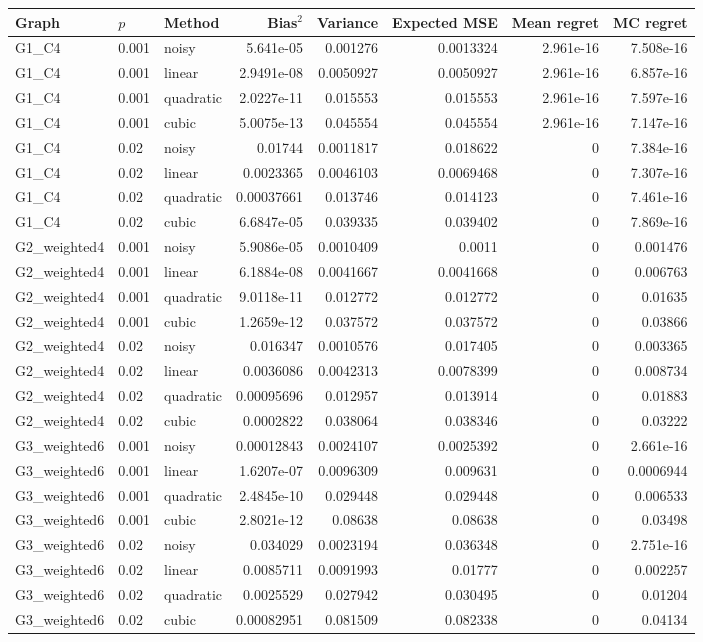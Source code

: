 \documentclass{article}
\begin{document}
\begin{center}\scriptsize
\begin{tabular}{lllrrrrr}\toprule
Graph & $p$ & Method & Bias$^2$ & Variance & Expected MSE & Mean regret & MC regret\\\midrule
G1\_C4 & 0.001 & noisy & 5.641e-05 & 0.001276 & 0.0013324 & 2.961e-16 & 7.508e-16 \\
G1\_C4 & 0.001 & linear & 2.9491e-08 & 0.0050927 & 0.0050927 & 2.961e-16 & 6.857e-16 \\
G1\_C4 & 0.001 & quadratic & 2.0227e-11 & 0.015553 & 0.015553 & 2.961e-16 & 7.597e-16 \\
G1\_C4 & 0.001 & cubic & 5.0075e-13 & 0.045554 & 0.045554 & 2.961e-16 & 7.147e-16 \\
G1\_C4 & 0.02 & noisy & 0.01744 & 0.0011817 & 0.018622 & 0 & 7.384e-16 \\
G1\_C4 & 0.02 & linear & 0.0023365 & 0.0046103 & 0.0069468 & 0 & 7.307e-16 \\
G1\_C4 & 0.02 & quadratic & 0.00037661 & 0.013746 & 0.014123 & 0 & 7.461e-16 \\
G1\_C4 & 0.02 & cubic & 6.6847e-05 & 0.039335 & 0.039402 & 0 & 7.869e-16 \\
G2\_weighted4 & 0.001 & noisy & 5.9086e-05 & 0.0010409 & 0.0011 & 0 & 0.001476 \\
G2\_weighted4 & 0.001 & linear & 6.1884e-08 & 0.0041667 & 0.0041668 & 0 & 0.006763 \\
G2\_weighted4 & 0.001 & quadratic & 9.0118e-11 & 0.012772 & 0.012772 & 0 & 0.01635 \\
G2\_weighted4 & 0.001 & cubic & 1.2659e-12 & 0.037572 & 0.037572 & 0 & 0.03866 \\
G2\_weighted4 & 0.02 & noisy & 0.016347 & 0.0010576 & 0.017405 & 0 & 0.003365 \\
G2\_weighted4 & 0.02 & linear & 0.0036086 & 0.0042313 & 0.0078399 & 0 & 0.008734 \\
G2\_weighted4 & 0.02 & quadratic & 0.00095696 & 0.012957 & 0.013914 & 0 & 0.01883 \\
G2\_weighted4 & 0.02 & cubic & 0.0002822 & 0.038064 & 0.038346 & 0 & 0.03222 \\
G3\_weighted6 & 0.001 & noisy & 0.00012843 & 0.0024107 & 0.0025392 & 0 & 2.661e-16 \\
G3\_weighted6 & 0.001 & linear & 1.6207e-07 & 0.0096309 & 0.009631 & 0 & 0.0006944 \\
G3\_weighted6 & 0.001 & quadratic & 2.4845e-10 & 0.029448 & 0.029448 & 0 & 0.006533 \\
G3\_weighted6 & 0.001 & cubic & 2.8021e-12 & 0.08638 & 0.08638 & 0 & 0.03498 \\
G3\_weighted6 & 0.02 & noisy & 0.034029 & 0.0023194 & 0.036348 & 0 & 2.751e-16 \\
G3\_weighted6 & 0.02 & linear & 0.0085711 & 0.0091993 & 0.01777 & 0 & 0.002257 \\
G3\_weighted6 & 0.02 & quadratic & 0.0025529 & 0.027942 & 0.030495 & 0 & 0.01204 \\
G3\_weighted6 & 0.02 & cubic & 0.00082951 & 0.081509 & 0.082338 & 0 & 0.04134 \\
\bottomrule\end{tabular}\end{center}
\end{document}
